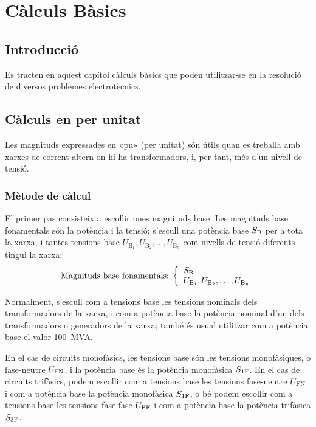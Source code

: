 \chapter{Càlculs Bàsics}\label{sec:ch-calc-bas}

\section{Introducció}
Es tracten en aquest capítol càlculs bàsics que poden utilitzar-se en la
resolució de diversos problemes electrotècnics.



\section{Càlculs en per unitat} \label{sec:seccio_pu} 

Les magnituds expressades en «pu» (per unitat) són útils quan es treballa
amb xarxes de corrent altern on hi ha transformadors, i, per tant, més d'un nivell de tensió.

\subsection{Mètode de càlcul} 

 El primer pas consisteix a
escollir unes magnituds base. Les magnituds base fonamentals són la
potència i la tensió; s'escull una potència base $S_\mathrm{B}$ per a
tota la xarxa, i tantes tensions base $U_{\text{B}_1}, U_{\text{B}_2}, \ldots,
U_{\text{B}_n}$ com nivells de tensió
diferents tingui la xarxa:
\begin{equation}
   \text{Magnituds base fonamentals:}\;\left\{
\begin{array}{l}
   S_\mathrm{B} \\
   U_{\text{B}_1}, U_{\text{B}_2}, \ldots, U_{\text{B}_n}
\end{array}
\right.
\end{equation}

Normalment, s'escull com a tensions base les tensions nominals dels transformadors de la
xarxa, i com a potència base la potència nominal d'un dels transformadors o generadors de la xarxa; també és usual utilitzar com a potència base el valor \qty{100}{MVA}.

En el cas de circuits monofàsics, les tensions base són les tensions monofàsiques, o fase-neutre $U_\mathrm{FN}$, i la potència base és la potència monofàsica $S_\mathrm{1F}$. En el cas de circuits trifàsics, podem escollir com a tensions base les tensions fase-neutre $U_\mathrm{FN}$ i com a potència base la potència  monofàsica $S_\mathrm{1F}$, o bé podem escollir com a tensions base les tensions fase-fase $U_\mathrm{FF}$ i com a potència base la potència trifàsica $S_\mathrm{3F}$.

